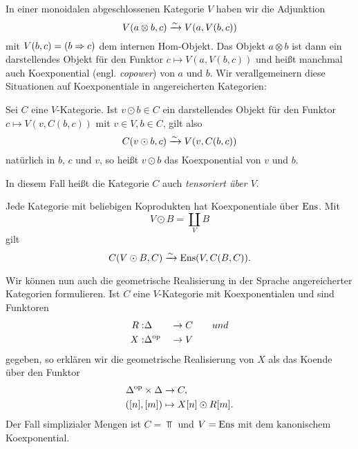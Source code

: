 In einer monoidalen abgeschlossenen Kategorie $V$ haben wir die
Adjunktion
\[ V(a \otimes b, c) \xrightarrow[]{\sim} V(a, V(b, c)) \]
mit $V(b, c) = (b \Rightarrow c)$ dem internen Hom-Objekt. Das Objekt $a
\otimes b$ ist dann ein darstellendes Objekt für den Funktor $c
\mapsto V(a, V(b, c))$ und heißt manchmal auch Koexponential
(engl. \emph{copower}) von $a$ und $b$. Wir verallgemeinern diese
Situationen auf Koexponentiale in angereicherten Kategorien:
\begin{defn} \label{def:copower}
  Sei $C$ eine $V$-Kategorie. Ist $v \odot b \in C$ ein darstellendes
  Objekt für den Funktor $c \mapsto V(v, C(b, c))$ mit $v \in V, b \in
  C$, gilt also
  \[ C(v \odot b, c) \xrightarrow[]{\sim} V(v, C(b, c)) \]
  natürlich in $b$, $c$ und $v$, so heißt $v \odot b$ das
  Koexponential von $v$ und $b$.
\end{defn}
In diesem Fall heißt die Kategorie $C$ auch \emph{tensoriert über
  $V$}.
\begin{bsp} \label{ens-tensored}
  Jede Kategorie mit beliebigen Koprodukten hat Koexponentiale über
  $\operatorname{Ens}$. Mit
  \[ V \odot B = \coprod_V B \]
  gilt
  \[ C(V \odot B, C) \xrightarrow[]{\sim} \operatorname{Ens}(V, C(B, C)). \]
\end{bsp}

Wir können nun auch die geometrische Realisierung in der Sprache
angereicherter Kategorien formulieren. Ist $C$ eine $V$-Kategorie mit
Koexponentialen und sind Funktoren
\begin{alignat*}{2}
  R: &\Delta &&\to C \qquad{und} \\
  X: &\Delta^\mathrm{op} &&\to V
\end{alignat*}
gegeben, so erklären wir die geometrische Realisierung von $X$ als das
Koende über den Funktor
\begin{align*}
  \Delta^\mathrm{op} \times \Delta &\to C, \\
  ([n], [m]) &\mapsto X[n] \odot R[m].
\end{align*}
Der Fall simplizialer Mengen ist $C = \Top$ und $V = \operatorname{Ens}$ mit dem
kanonischem Koexponential.

